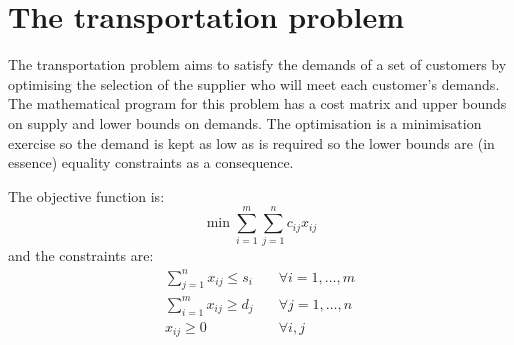 \section{The transportation problem}

The transportation problem aims to satisfy the demands of a set of customers by optimising the selection of the supplier who will meet each customer's demands. The mathematical program for this problem has a cost matrix and upper bounds on supply and lower bounds on demands. The optimisation is a minimisation exercise so the demand is kept as low as is required so the lower bounds are (in essence) equality constraints as a consequence.

The objective function is:\begin{equation}\label{OperResTransObj}
\min{ \sum_{i=1}^m{ \sum_{j=1}^n{
c_{ij}x_{ij}
}}}\end{equation}
and the constraints are:
\begin{eqnarray*} \sum_{j=1}^n { x_{ij}} \le s_i& \quad \forall i=1,\ldots,m\\
\sum_{i=1}^m { x_{ij}} \ge d_j& \quad \forall j=1,\ldots,n\\
x_{ij} \ge 0& \quad \forall i,j\\
\end{eqnarray*} 

